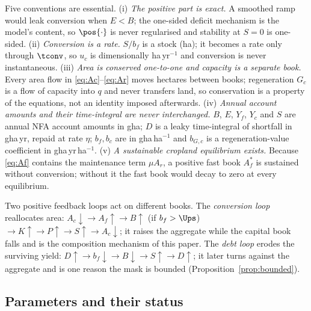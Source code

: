 Five conventions are essential. (i) \emph{The positive part is exact.} A smoothed ramp would leak conversion when $E<B$; the one-sided deficit mechanism is the model's content, so $\pos{\cdot}$ is never regularised and stability at $S=0$ is one-sided. (ii) \emph{Conversion is a rate.} $S/b_f$ is a stock (ha); it becomes a rate only through $\tconv$, so $u_c$ is dimensionally ha\,yr$^{-1}$ and conversion is never instantaneous. (iii) \emph{Area is conserved one-to-one and capacity is a separate book.} Every area flow in \eqref{eq:Ac}--\eqref{eq:Ar} moves hectares between books; regeneration $G_c$ is a flow of capacity into $q$ and never transfers land, so conservation is a property of the equations, not an identity imposed afterwards. (iv) \emph{Annual account amounts and their time-integral are never interchanged.} $B$, $E$, $Y_f$, $Y_c$ and $S$ are annual NFA account amounts in gha; $D$ is a leaky time-integral of shortfall in gha\,yr, repaid at rate $\eta$; $b_f,b_c$ are in gha\,ha$^{-1}$ and $b_{G,c}$ is a regeneration-value coefficient in gha\,yr\,ha$^{-1}$. (v) \emph{A sustainable cropland equilibrium exists.} Because \eqref{eq:Af} contains the maintenance term $\mu A_r$, a positive fast book $A_f^*$ is sustained without conversion; without it the fast book would decay to zero at every equilibrium.

Two positive feedback loops act on different books. The \emph{conversion loop} reallocates area: $A_c\downarrow\to A_f\uparrow\to B\uparrow$ (if $b_f>\Ups$) $\to K\uparrow\to P\uparrow\to S\uparrow\to A_c\downarrow$; it raises the aggregate while the capital book falls and is the composition mechanism of this paper. The \emph{debt loop} erodes the surviving yield: $D\uparrow\to b_f\downarrow\to B\downarrow\to S\uparrow\to D\uparrow$; it later turns against the aggregate and is one reason the mask is bounded (Proposition~\ref{prop:bounded}).

\subsection{Parameters and their status}\label{sec:params}

